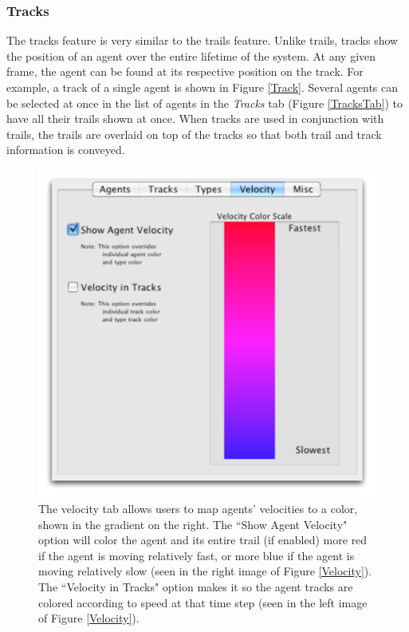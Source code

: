 \documentclass[conference]{IEEEtran}
\begin{document}
\subsubsection{Tracks}

The tracks feature is very similar to the trails feature. Unlike trails, tracks show the position of an agent over the entire
lifetime of the system. At any given frame, the agent can be found at its respective position on the track.
For example, a track of a single agent is shown in Figure \ref{Track}.
Several agents can be selected at once in the list of agents in the \textit{Tracks} tab (Figure \ref{TracksTab}) to
have all their trails shown at once.
When tracks are used in conjunction with trails, the trails are overlaid on top of the tracks so that
both trail and track information is conveyed.





\begin{figure}
\centering
\includegraphics[scale=.5]{images/velocitytab.pdf}
\caption{
The velocity tab allows users to map agents' velocities to a color, shown in the gradient on the right. The ``Show Agent Velocity"
option will color the agent and its entire trail (if enabled) more red if the agent is moving relatively fast, or more blue if the agent
is moving relatively slow (seen in the right image of Figure \ref{Velocity}).
The ``Velocity in Tracks" option makes it so the agent tracks are colored according to speed at that time step (seen in the left
image of Figure \ref{Velocity}).}
\label{VelocityTab}
\end{figure}
\end{document}
